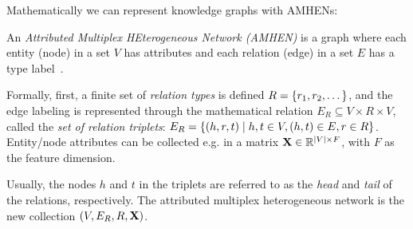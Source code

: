 
Mathematically we can represent knowledge graphs with AMHENs:
\begin{definition}
An \emph{Attributed Multiplex HEterogeneous Network (AMHEN)} is a graph where each entity (node) in a set $V$ has attributes and each relation (edge) in a set $E$ has a type label~\cite{liu_ahng_2019,cen_representation_2019}. 

Formally, first, a finite set of \emph{relation types} is defined $R = \mathopen{}\left\{r_1,r_2,\dots\right\}$, and the edge labeling is represented through the mathematical relation $E_R \subseteq V \times R \times V$, called the \emph{set of relation triplets}:  $E_R = \mathopen{}\left\{\mathopen{}\left(h,r,t\right) \mid h,t \in V, \mathopen{}\left(h,t\right) \in E, r \in R\right\}$. Entity/node attributes can be collected e.g. in a matrix $\mathbf{X} \in \mathbb{R}^{\mathopen{}\left|V\right| \times F}$, with $F$ as the feature dimension. 

Usually, the nodes $h$ and $t$ in the triplets are referred to as the \emph{head} and \emph{tail} of the relations, respectively. The attributed multiplex heterogeneous network is the new collection $\mathopen{}\left(V, E_R, R, \mathbf{X}\right)$.
\end{definition}

